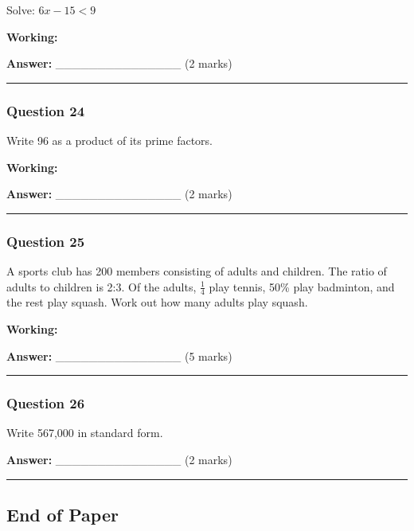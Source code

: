 Solve: \(6x - 15 < 9\)

\textbf{Working:}

\textbf{Answer:} \_\_\_\_\_\_\_\_\_\_\_\_\_\_\_ (2 marks)

\begin{center}\rule{0.5\linewidth}{0.5pt}\end{center}

\subsubsection{Question 24}\label{question-24}

Write 96 as a product of its prime factors.

\textbf{Working:}

\textbf{Answer:} \_\_\_\_\_\_\_\_\_\_\_\_\_\_\_ (2 marks)

\begin{center}\rule{0.5\linewidth}{0.5pt}\end{center}

\subsubsection{Question 25}\label{question-25}

A sports club has 200 members consisting of adults and children. The
ratio of adults to children is 2:3. Of the adults, \(\frac{1}{4}\) play
tennis, 50\% play badminton, and the rest play squash. Work out how many
adults play squash.

\textbf{Working:}

\textbf{Answer:} \_\_\_\_\_\_\_\_\_\_\_\_\_\_\_ (5 marks)

\begin{center}\rule{0.5\linewidth}{0.5pt}\end{center}

\subsubsection{Question 26}\label{question-26}

Write 567,000 in standard form.

\textbf{Answer:} \_\_\_\_\_\_\_\_\_\_\_\_\_\_\_ (2 marks)

\begin{center}\rule{0.5\linewidth}{0.5pt}\end{center}

\subsection{End of Paper}\label{end-of-paper}

